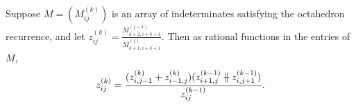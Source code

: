 \documentclass[ALCO,Unicode,published]{cedram}
\numberwithin{equation}{section}
\newcommand{\parallelsum}{\:\ \mathclap{\|}\mathclap{-}\ \:}
\begin{document}
\begin{Lemma}\label{lemma:arraytoggle}
Suppose $M = (M_{ij}^{(k)})$ is an array of indeterminates satisfying the octahedron recurrence, and let $z_{ij}^{(k)} = \frac{M_{k+2,i+k+1}^{(j-1)}}{M_{k+1,i+k+1}^{(j)}}$.
Then as rational functions in the entries of $M$, \[z_{ij}^{(k)} = \frac{(z_{i,j-1}^{(k)}+z_{i-1,j}^{(k)})(z_{i+1,j}^{(k-1)}\parallelsum z_{i,j+1}^{(k-1)})}{z_{ij}^{(k-1)}}.\]





\end{Lemma}
\end{document}
